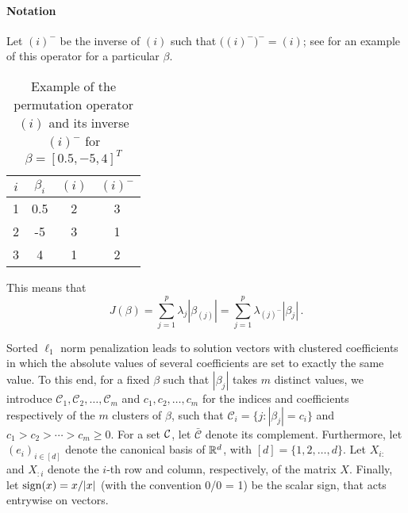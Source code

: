 \paragraph{Notation}\label{sec:notation}

Let \((i)^{-}\) be the inverse of \((i)\) such that
\(\big((i)^-\big)^- = (i)\); see  for an
example of this operator for a particular \(\beta\).
\begin{table}[bt]
  \centering
  \caption{Example of the permutation operator \((i)\) and its inverse
    \((i)^-\) for $\beta = [0.5, -5, 4]^T$}
    \label{tab:permutation-example}
  \begin{tabular}{cS[table-format=-1.1,round-mode=off]cc}
    \toprule
    \(i\) & {\(\beta_i\)} & \((i)\) & \((i)^-\) \\
         & 0.5         & 2       & 3         \\
    2     & -5          & 3       & 1         \\
    3     & 4           & 1       & 2         \\
    \bottomrule
  \end{tabular}
\end{table}
This means that
\[
  J(\beta) = \sum_{j=1}^p \lambda_j |\beta_{(j)}|
  = \sum_{j=1}^p \lambda_{(j)^-}|\beta_j| \,.
\]

Sorted $\ell_1$ norm penalization leads to solution vectors with clustered coefficients in which the absolute values of several coefficients are set to exactly the same value.
To this end, for a fixed $\beta$ such that $|\beta_j|$ takes $m$ distinct values, we introduce \(\mathcal{C}_1, \mathcal{C}_2 , \dots, \mathcal{C}_m\) and \(c_1,
c_2, \dots, c_m\) for the indices and coefficients respectively of the \(m\)
clusters of $\beta$, such that
$\mathcal{C}_i = \{j : |\beta_j| = c_i\}$ and $c_1 > c_2 > \cdots > c_m \geq 0.$
For a set $\mathcal{C}$, let \(\bar{\mathcal{C}}\) denote its complement.
Furthermore, let $(e_i)_{i \in [d]}$ denote the canonical basis of $\mathbb{R}^d$, with \([d] = \{1,2,\dots,d\}\).
Let $X_{i:}$ and $X_{:i}$ denote the $i$-th row and column, respectively, of the matrix $X$.
Finally, let $\operatorname{sign}(x) = x / |x|$ (with the convention 0/0 = 1) be the scalar sign, that acts entrywise on vectors.


